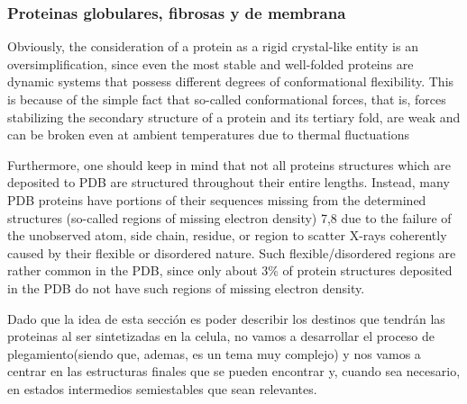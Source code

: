 



\subsubsection{Proteinas globulares, fibrosas y de membrana}



Obviously, the consideration of a protein as a rigid crystal-like entity is an oversimplification, since even the most stable and well-folded proteins are dynamic systems that possess different degrees of conformational flexibility.
This is because of the simple fact that so-called conformational forces, that is, forces stabilizing the secondary structure of a protein and its tertiary fold, are weak and can be broken even at ambient temperatures due to thermal fluctuations

Furthermore, one should keep in mind that not all proteins structures which are deposited to PDB are structured throughout their entire lengths. Instead, many PDB proteins
have portions of their sequences missing from the determined structures (so-called regions of missing electron density) 7,8 due to the failure of the unobserved atom, side chain, residue, or region to scatter
X-rays coherently caused by their flexible or disordered nature. Such flexible/disordered regions are rather common in the PDB, since only about 3\% of
protein structures deposited in the PDB do not have such regions of missing electron density.


  
Dado que la idea de esta sección es poder describir los destinos que tendrán las proteinas al ser sintetizadas en la celula, 
no vamos a desarrollar el proceso de plegamiento(siendo que, ademas, es un tema muy complejo) y nos vamos a centrar en las estructuras finales que se pueden encontrar y, cuando sea necesario, en estados intermedios semiestables que sean relevantes.

